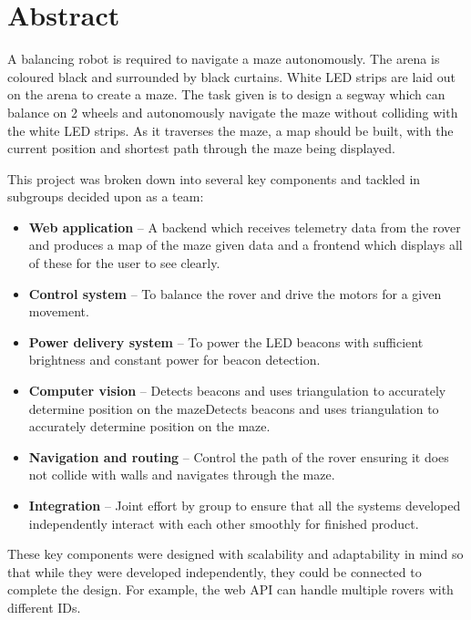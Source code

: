 \section{Abstract}

A balancing robot is required to navigate a maze autonomously. The arena is coloured black and surrounded by black curtains. White LED strips are laid out on the arena to create a maze. The task given is to design a segway which can balance on 2 wheels and autonomously navigate the maze without colliding with the white LED strips. As it traverses the maze, a map should be built, with the current position and shortest path through the maze being displayed. 

This project was broken down into several key components and tackled in subgroups decided upon as a team:
\begin{itemize}
    \item \textbf{Web application} --  A backend which receives telemetry data from the rover and produces a map of the maze given data and a frontend which displays all of these for the user to see clearly.
    \item \textbf{Control system} -- To balance the rover and drive the motors for a given movement.
    \item \textbf{Power delivery system} -- To power the LED beacons with sufficient brightness and constant power for beacon detection.
    \item \textbf{Computer vision} -- Detects beacons and uses triangulation to accurately determine position on the mazeDetects beacons and uses triangulation to accurately determine position on the maze.
    \item \textbf{Navigation and routing} -- Control the path of the rover ensuring it does not collide with walls and navigates through the maze.
    \item \textbf{Integration} -- Joint effort by group to ensure that all the systems developed independently interact with each other smoothly for finished product.
\end{itemize}

These key components were designed with scalability and adaptability in mind so that while they were developed independently, they could be connected to complete the design. For example, the web API can handle multiple rovers with different IDs.
